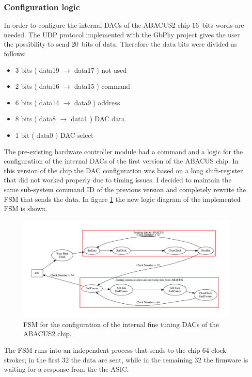 \subsubsection{Configuration logic}\label{confing}
In order to configure the internal DACs of the ABACUS2 chip 16~bits words are needed. The UDP protocol implemented with the GbPhy project gives the user the possibility to send 20~bits of data.
Therefore the data bits were divided as follows:
\begin{itemize}
	\item 3 bits ( data19 $\rightarrow$ data17 ) not used
	\item 2 bits ( data16 $\rightarrow$ data15 ) command
	\item 6 bits ( data14 $\rightarrow$ data9 ) address
	\item 8 bits ( data8 $\rightarrow$ data1 ) DAC data
	\item 1 bit ( data0 ) DAC select
\end{itemize}
\noindent The pre-existing hardware controller module had a command and a logic for the configuration of the internal DACs of the first version of the ABACUS chip.
In this version of the chip the DAC configuration was based on a long shift-register that did not worked properly due to timing issues.
I decided to maintain the same sub-system command ID of the previous version and completely rewrite the FSM that sends the data. 
In figure \ref{fig:fsmDACs} the new logic diagram of the implemented FSM is shown.
\begin{figure}[H]
	\centering
	\includegraphics[width=1.0\linewidth]{FSMdiagrams/InternalDACsFSM.pdf}
	\caption{FSM for the configuration of the internal fine tuning DACs of the ABACUS2 chip.}
	\label{fig:fsmDACs}
\end{figure}
\noindent The FSM runs into an independent process that sends to the chip 64 clock strokes; in the first 32 the data are sent, while in the remaining 32 the firmware is waiting for a response from the the ASIC.
